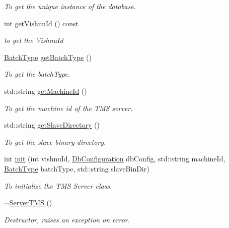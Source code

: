 \begin{DoxyCompactItemize}
\begin{DoxyCompactList}\small\item\em To get the unique instance of the database. \item\end{DoxyCompactList}\item 
int \hyperlink{classServerTMS_a5fac8b45cc0ae90d910d3c132bb5109f}{getVishnuId} () const 
\begin{DoxyCompactList}\small\item\em to get the VishnuId \item\end{DoxyCompactList}\item 
\hyperlink{utilVishnu_8hpp_a864d748e7097d176552dd4c7635016ea}{BatchType} \hyperlink{classServerTMS_a60ed1874cf24873ad1ed23dedf4b8a52}{getBatchType} ()
\begin{DoxyCompactList}\small\item\em To get the batchType. \item\end{DoxyCompactList}\item 
std::string \hyperlink{classServerTMS_af752c2bd0207bf83128f31736137dca5}{getMachineId} ()
\begin{DoxyCompactList}\small\item\em To get the machine id of the TMS server. \item\end{DoxyCompactList}\item 
std::string \hyperlink{classServerTMS_ae648d1d9e96c1d4714afec133e0ee136}{getSlaveDirectory} ()
\begin{DoxyCompactList}\small\item\em To get the slave binary directory. \item\end{DoxyCompactList}\item 
int \hyperlink{classServerTMS_a0321b85dc1b8b14aa773ad4b535c33ce}{init} (int vishnuId, \hyperlink{classDbConfiguration}{DbConfiguration} dbConfig, std::string machineId, \hyperlink{utilVishnu_8hpp_a864d748e7097d176552dd4c7635016ea}{BatchType} batchType, std::string slaveBinDir)
\begin{DoxyCompactList}\small\item\em To initialize the TMS Server class. \item\end{DoxyCompactList}\item 
\hypertarget{classServerTMS_a87b307d0e656c9f0e59d782b1f9ab867}{
\hyperlink{classServerTMS_a87b307d0e656c9f0e59d782b1f9ab867}{$\sim$ServerTMS} ()}
\label{classServerTMS_a87b307d0e656c9f0e59d782b1f9ab867}

\begin{DoxyCompactList}\small\item\em Destructor, raises an exception on error. \item\end{DoxyCompactList}\end{DoxyCompactItemize}
